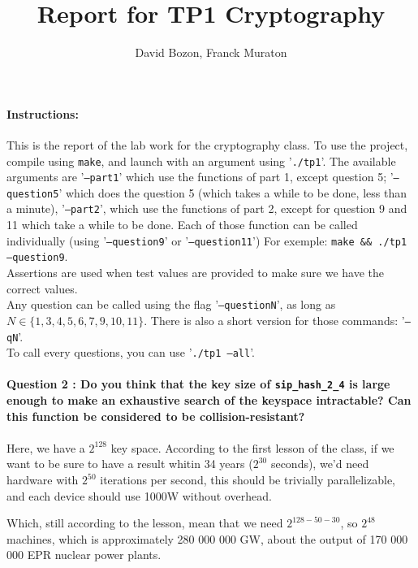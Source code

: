 \documentclass[4apaper]{report}
\author{David Bozon, Franck Muraton}
\begin{document}
\title{Report for TP1 Cryptography}
\maketitle

\paragraph{Instructions: \\} This is the report of the lab work for the cryptography class. To use the project, compile using \texttt{make}, and launch with an argument using '\texttt{./tp1}'. The available arguments are '\texttt{--part1}' which use the functions of part 1, except question 5; '\texttt{--question5}' which does the question 5 (which takes a while to be done, less than a minute), '\texttt{--part2}', which use the functions of part 2, except for question 9 and 11 which take a while to be done. Each of those function can be called individually (using '\texttt{--question9}' or '\texttt{--question11}') For exemple: \texttt{make \&\& ./tp1 --question9}. \\ Assertions are used when test values are provided to make sure we have the correct values. \\Any question can be called using the flag '\texttt{--questionN}', as long as $N \in \{1,3,4,5,6,7,9,10,11\}$. There is also a short version for those commands: '\texttt{--qN}'. \\To call every questions, you can use '\texttt{./tp1 --all}'.

\paragraph{Question 2 : Do you think that the key size of \texttt{sip\_hash\_2\_4} is large enough to make an exhaustive search of the keyspace intractable? Can this function be considered to be collision-resistant?}

\paragraph{}Here, we have a $2^{128}$ key space. According to the first lesson of the class, if we want to be sure to have a result whitin 34 years ($2^{30}$ seconds), we'd need hardware with $2^{50}$ iterations per second, this should be trivially parallelizable, and each device should use 1000W without overhead.

Which, still according to the lesson, mean that we need $2^{128-50-30}$, so $2^{48}$ machines, which is approximately 280 000 000 GW, about the output of 170 000 000 EPR nuclear power plants.
\end{document}

